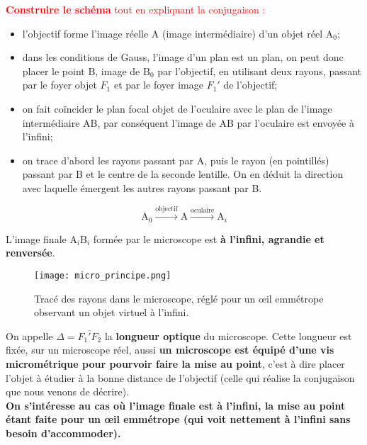 \documentclass[11pt,a4paper]{report}
\begin{document}
\textcolor{red}{\textbf{Construire le schéma} tout en expliquant la conjugaison :} 
\begin{itemize}
	\item l'objectif forme l'image réelle A (image intermédiaire) d'un objet réel $\text{A}_0$;
	\item dans les conditions de Gauss, l'image d'un plan est un plan, on peut donc placer le point 		B, image de $\text{B}_0$ par l'objectif, en utilisant deux rayons, passant par le foyer objet 			$F_1$ et par le foyer image $F_1'$ de l'objectif;
	\item on fait coïncider le plan focal objet de l'oculaire avec le plan de l'image intermédiaire 		AB, par conséquent l'image de AB par l'oculaire est envoyée à l'infini;
	\item on trace d'abord les rayons passant par A, puis le rayon (en pointillés) passant par B et 		le centre de la seconde lentille. On en déduit la direction avec laquelle émergent les autres 			rayons passant par B.
\end{itemize}

\begin{equation}
	\text{A}_0 \xrightarrow{\text{objectif}} \text{A} \xrightarrow{\text{oculaire}} \text{A}_i
\end{equation}

L'image finale $\text{A}_i\text{B}_i$ formée par le microscope est \textbf{à l'infini, agrandie et renversée}.

\begin{figure}[h!]
	\begin{center}
   		\texttt{[image: micro\_principe.png]}\\
	\end{center}
	\caption{Tracé des rayons dans le microscope, réglé pour un œil emmétrope observant un objet 			virtuel à l'infini.}
\end{figure}

On appelle $\Delta = \overline{F_1' F_2}$ la \textbf{longueur optique} du microscope. Cette longueur est fixée, sur un microscope réel, aussi \textbf{un microscope est équipé d'une vis micrométrique pour pourvoir faire la mise au point}, c'est à dire placer l'objet à étudier à la bonne distance de l'objectif (celle qui réalise la conjugaison que nous venons de décrire).\\

\textbf{On s'intéresse au cas où l'image finale est à l'infini, la mise au point étant faite pour un œil emmétrope (qui voit nettement à l'infini sans besoin d'accommoder).}
\end{document}

